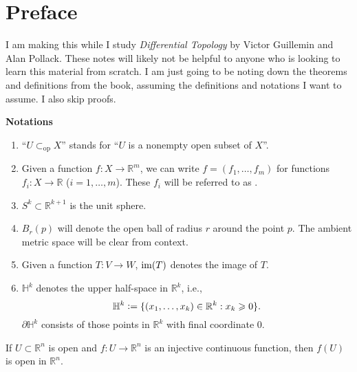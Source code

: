 \documentclass[12pt]{article}
\newcommand{\opsub}{\subset_{\operatorname{op}}}
\begin{document}
\coverpage
\thispagestyle{empty}
\updated{\today}
\thispagestyle{empty}
\tableofcontents
\pagestyle{fancy}
\setcounter{section}{-1}

\section{Preface}

I am making this while I study \emph{Differential Topology} by Victor Guillemin and Alan Pollack. These notes will likely not be helpful to anyone who is looking to learn this material from scratch. I am just going to be noting down the theorems and definitions from the book, assuming the definitions and notations I want to assume. I also skip proofs.

\textbf{Notations}
\begin{enumerate}
	\item ``$U \opsub X$'' stands for ``$U$ is a nonempty open subset of $X$''.
	\item Given a function $f : X \to \mathbb{R}^{m}$, we can write $f = (f_{1}, \ldots, f_{m})$ for functions $f_{i} : X \to \mathbb{R}$ ($i = 1, \ldots, m$). These $f_{i}$ will be referred to as .
	\item $S^{k} \subset \mathbb{R}^{k + 1}$ is the unit sphere.
	\item $B_{r}(p)$ will denote the open ball of radius $r$ around the point $p$. The ambient metric space will be clear from context.
	\item Given a function $T : V \to W$, $\im(T)$ denotes the image of $T$.
	\item $\mathbb{H}^{k}$ denotes the upper half-space in $\mathbb{R}^{k}$, i.e.,
	\begin{equation*} 
		\mathbb{H}^{k} \vcentcolon= \{(x_{1}, \ldots, x_{k}) \in \mathbb{R}^{k} : x_{k} \ge 0\}.
	\end{equation*}
	$\partial \mathbb{H}^{k}$ consists of those points in $\mathbb{R}^{k}$ with final coordinate $0$.
\end{enumerate}

\begin{thm} \label{thm:invariance-of-domain}
	If $U \subset \mathbb{R}^{n}$ is open and $f : U \to \mathbb{R}^{n}$ is an injective continuous function, then $f(U)$ is open in $\mathbb{R}^{n}$.
\end{thm}
\end{document}
